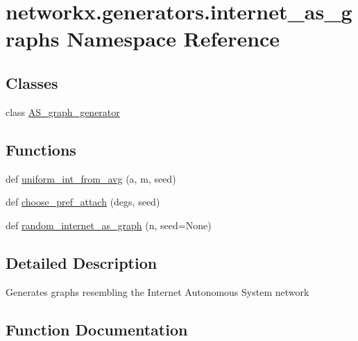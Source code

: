 \hypertarget{namespacenetworkx_1_1generators_1_1internet__as__graphs}{}\section{networkx.\+generators.\+internet\+\_\+as\+\_\+graphs Namespace Reference}
\label{namespacenetworkx_1_1generators_1_1internet__as__graphs}
\subsection*{Classes}
\begin{DoxyCompactItemize}
\item 
class \hyperlink{classnetworkx_1_1generators_1_1internet__as__graphs_1_1AS__graph__generator}{A\+S\+\_\+graph\+\_\+generator}
\end{DoxyCompactItemize}
\subsection*{Functions}
\begin{DoxyCompactItemize}
\item 
def \hyperlink{namespacenetworkx_1_1generators_1_1internet__as__graphs_a09f4314be4097be64da21f945dca73f3}{uniform\+\_\+int\+\_\+from\+\_\+avg} (a, m, seed)
\item 
def \hyperlink{namespacenetworkx_1_1generators_1_1internet__as__graphs_a92f1b4b5f8705d8e2b32b1c1dd569df5}{choose\+\_\+pref\+\_\+attach} (degs, seed)
\item 
def \hyperlink{namespacenetworkx_1_1generators_1_1internet__as__graphs_a0615563501ff2b39c8beaa26114feb37}{random\+\_\+internet\+\_\+as\+\_\+graph} (n, seed=None)
\end{DoxyCompactItemize}


\subsection{Detailed Description}
\begin{DoxyVerb}Generates graphs resembling the Internet Autonomous System network\end{DoxyVerb}
 

\subsection{Function Documentation}
\mbox{\label{namespacenetworkx_1_1generators_1_1internet__as__graphs_a92f1b4b5f8705d8e2b32b1c1dd569df5}} 
